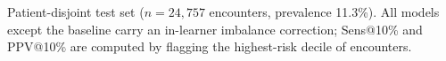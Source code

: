 {\footnotesize Patient-disjoint test set ($n=24,757$ encounters, prevalence 11.3\%). All models except the baseline carry an in-learner imbalance correction; Sens@10\% and PPV@10\% are computed by flagging the highest-risk decile of encounters.}
